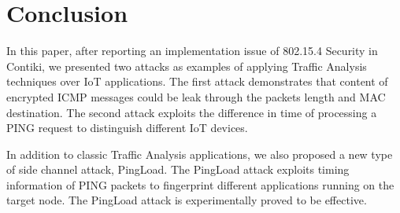 \section{Conclusion \label{conclusion}}

In this paper, after reporting an implementation issue of 802.15.4 Security in Contiki, we presented two attacks as examples of applying Traffic Analysis techniques over IoT applications. The first attack demonstrates that content of encrypted ICMP messages could be leak through the packets length and MAC destination. The second attack exploits the difference in time of processing a PING request to distinguish different IoT devices.

In addition to classic Traffic Analysis applications, we also proposed a new type of side channel attack, PingLoad. The PingLoad attack exploits timing information of PING packets to fingerprint different applications running on the target node. The PingLoad attack is experimentally proved to be effective.